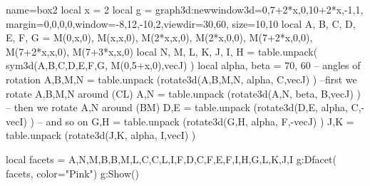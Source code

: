 \documentclass[12pt]{standalone}
\begin{document}
\begin{luadraw}{name=box2}
local x = 2
local g = graph3d:new{window3d={0,7+2*x,0,10+2*x,-1,1}, margin={0,0,0,0},window={-8,12,-10,2},viewdir={30,60}, size={10,10}}
local A, B, C, D, E, F, G = M(0,x,0), M(x,x,0), M(2*x,x,0), M(2*x,0,0), M(7+2*x,0,0), M(7+2*x,x,0), M(7+3*x,x,0)
local N, M, L, K, J, I, H = table.unpack( sym3d({A,B,C,D,E,F,G}, {M(0,5+x,0),vecJ}) )
local alpha, beta = 70, 60 -- angles of rotation
A,B,M,N = table.unpack (rotate3d({A,B,M,N}, alpha, {C,vecJ}) ) --first we rotate A,B,M,N around (CL)
A,N = table.unpack (rotate3d({A,N}, beta, {B,vecJ}) ) -- then we rotate A,N around (BM)
D,E = table.unpack (rotate3d({D,E}, alpha, {C,-vecI}) ) -- and so on
G,H = table.unpack (rotate3d({G,H}, alpha, {F,-vecJ}) )
J,K = table.unpack (rotate3d({J,K}, alpha, {I,vecI}) )

local facets = {{A,N,M,B},{B,M,L,C},{C,L,I,F},{D,C,F,E},{F,I,H,G},{L,K,J,I} }
g:Dfacet( facets, {color="Pink"})
g:Show() 
\end{luadraw}
\end{document}
